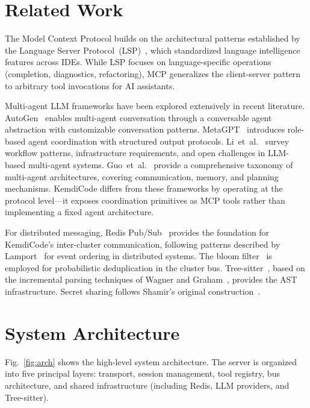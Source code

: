 \documentclass[journal,10pt]{IEEEtran}
\begin{document}
\section{Related Work}
\label{sec:related}

The Model Context Protocol builds on the architectural patterns established by the Language Server Protocol~(LSP)~\cite{lsp2016}, which standardized language intelligence features across IDEs. While LSP focuses on language-specific operations (completion, diagnostics, refactoring), MCP generalizes the client-server pattern to arbitrary tool invocations for AI assistants.

Multi-agent LLM frameworks have been explored extensively in recent literature. AutoGen~\cite{wu2023autogen} enables multi-agent conversation through a conversable agent abstraction with customizable conversation patterns. MetaGPT~\cite{hong2023metagpt} introduces role-based agent coordination with structured output protocols. Li~et~al.~\cite{li2024multiagent} survey workflow patterns, infrastructure requirements, and open challenges in LLM-based multi-agent systems. Guo~et~al.~\cite{guo2024ijcai} provide a comprehensive taxonomy of multi-agent architectures, covering communication, memory, and planning mechanisms. KemdiCode differs from these frameworks by operating at the protocol level---it exposes coordination primitives as MCP tools rather than implementing a fixed agent architecture.

For distributed messaging, Redis Pub/Sub~\cite{redis} provides the foundation for KemdiCode's inter-cluster communication, following patterns described by Lamport~\cite{lamport1978} for event ordering in distributed systems. The bloom filter~\cite{bloom1970} is employed for probabilistic deduplication in the cluster bus. Tree-sitter~\cite{treesitter}, based on the incremental parsing techniques of Wagner and Graham~\cite{wagner1998}, provides the AST infrastructure. Secret sharing follows Shamir's original construction~\cite{shamir1979}.

\section{System Architecture}
\label{sec:arch}

Fig.~\ref{fig:arch} shows the high-level system architecture. The server is organized into five principal layers: transport, session management, tool registry, bus architecture, and shared infrastructure (including Redis, LLM providers, and Tree-sitter).
\end{document}

